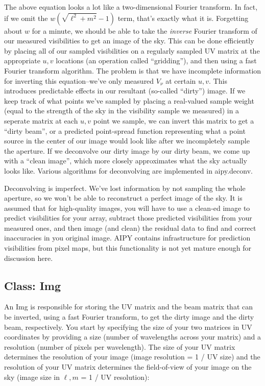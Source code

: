 The above equation looks a lot like a two-dimensional Fourier transform.  In
fact, if we omit the $w(\sqrt{\ell^2+m^2}-1)$ term, that's exactly what it is.
Forgetting about $w$ for a minute, we should be able to take the {\it inverse}
Fourier transform of our measured visibilities to get an image of the sky.
This can be done efficiently by placing all of our sampled visibilities on a
regularly sampled UV matrix at the appropriate $u,v$ locations (an operation
called ``gridding''), and then using a fast Fourier transform algorithm.  The
problem is that we have incomplete information for inverting this
equation--we've only measured $V_\nu$ at certain $u,v$.  This introduces
predictable effects in our resultant (so-called ``dirty'') image.  If we keep
track of what points we've sampled by placing a real-valued sample weight
(equal to the strength of the sky in the visibility sample we measured) in
a seperate matrix at each $u,v$ point we sample, we can invert this matrix
to get a ``dirty beam'', or a predicted point-spread function representing
what a point source in the center of our image would look like after we
incompletely sample the aperture.  If we deconvolve our dirty image by our
dirty beam, we come up with a ``clean image'', which more closely approximates
what the sky actually looks like.  Various algorithms for deconvolving
are implemented in aipy.deconv.

Deconvolving is imperfect.  We've lost information by not sampling the
whole aperture, so we won't be able to reconstruct a perfect image of the
sky.  It is assumed that for high-quality images, you will have to use
a clean-ed image to predict visibilities for your array, subtract those
predicted visibilities from your measured ones, and then image (and clean)
the residual data to find and correct inaccuracies in you original image.
AIPY contains infrastructure for prediction visibilities from pixel maps,
but this functionality is not yet mature enough for discussion here.

\subsection{Class: Img}

An Img is responsible for storing the UV matrix and the beam matrix that 
can be inverted, using a fast Fourier transform, to get the dirty image
and the dirty beam, respectively.  You start by specifying the size
of your two matrices in UV coordinates by providing a size (number of
wavelengths across your matrix) and a resolution (number of pixels per
wavelength).  The size of your UV matrix determines the resolution
of your image (image resolution = 1 / UV size) and the resolution of
your UV matrix determines the field-of-view of your image on the sky
(image size in $\ell,m$ = 1 / UV resolution):


